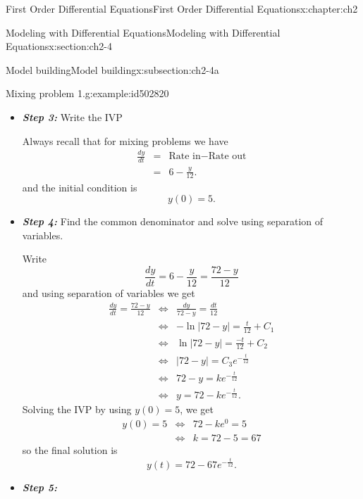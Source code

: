 \documentclass[oneside,10pt,]{book}
\newcommand{\alert}[1]{\textbf{\textit{#1}}}
\numberwithin{equation}{section}
\numberwithin{equation}{section}
\newcommand{\amp}{&}
\begin{document}
\begin{chapterptx}{First Order Differential Equations}{}{First Order Differential Equations}{}{}{x:chapter:ch2}
\begin{sectionptx}{Modeling with Differential Equations}{}{Modeling with Differential Equations}{}{}{x:section:ch2-4}
\begin{subsectionptx}{Model building}{}{Model building}{}{}{x:subsection:ch2-4a}
\begin{example}{Mixing problem 1.}{g:example:id502820}
\begin{itemize}[label=\textbullet]
\begin{align*}
\mbox{Rate out } \amp = \amp \left(\begin{array}{c}
\mbox{concentration}\\
\mbox{of stuff going out}
\end{array}\right)\times\mbox{Rate}\\
\amp = \amp \left(\frac{y(t)}{60} \frac{\mbox{kg}}{\mbox{L}}\right)\times5\frac{\mbox{L}}{\mbox{min}}.\\
\amp = \amp \frac{y(t)}{12}\frac{\mbox{kg}}{\mbox{min}}.
\end{align*}
\item{}\alert{Step 3:} Write the IVP%
\par
Always recall that for mixing problems we have%
\begin{align*}
\frac{dy}{dt} \amp = \amp \mbox{Rate in}-\mbox{Rate out}\\
\amp = \amp 6-\frac{y}{12}.
\end{align*}
and the initial condition is%
\begin{equation*}
y(0)=5.
\end{equation*}
%
\item{}\alert{Step 4:} Find the common denominator and solve using separation of variables.%
\par
Write%
\begin{equation*}
\frac{dy}{dt}=6-\frac{y}{12}=\frac{72-y}{12}
\end{equation*}
and using separation of variables we get%
\begin{align*}
\frac{dy}{dt}=\frac{72-y}{12} \amp \iff \amp \frac{dy}{72-y}=\frac{dt}{12}\\
\amp \iff \amp -\ln\left|72-y\right|=\frac{t}{12}+C_{1}\\
\amp \iff \amp \ln\left|72-y\right|=\frac{-t}{12}+C_{2}\\
\amp \iff \amp \left|72-y\right|=C_{3}e^{-\frac{t}{12}}\\
\amp \iff \amp 72-y=ke^{-\frac{t}{12}}\\
\amp \iff \amp y=72-ke^{-\frac{t}{12}}.
\end{align*}
Solving the IVP by using \(y(0)=5\), we get%
\begin{align*}
y(0)=5 \amp \iff \amp 72-ke^{0}=5\\
\amp \iff \amp k=72-5=67
\end{align*}
so the final solution is%
\begin{equation*}
y(t)=72-67e^{-\frac{t}{12}}.
\end{equation*}
%
\item{}\alert{Step 5:}%

\end{itemize}
\end{example}
\end{subsectionptx}
\end{sectionptx}
\end{chapterptx}
\end{document}
